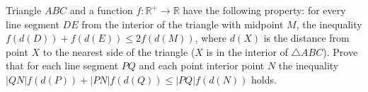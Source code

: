 Triangle $ABC$ and a function $f:\mathbb{R}^+\to\mathbb{R}$ have the following property: for every line segment $DE$ from the interior of the triangle with midpoint $M$, the inequality $f(d(D))+f(d(E))\le 2f(d(M))$, where $d(X)$ is the distance from point $X$ to the nearest side of the triangle ($X$ is in the interior of $\triangle ABC$). Prove that for each line segment $PQ$ and each point interior point $N$ the inequality $|QN|f(d(P))+|PN|f(d(Q))\le |PQ|f(d(N))$ holds.